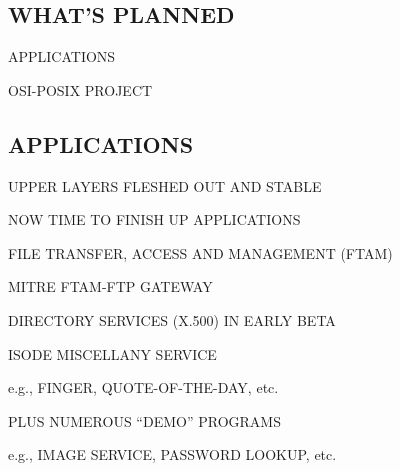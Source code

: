 

\begin{bwslide}
\part	{WHAT'S PLANNED}\bf

\begin{nrtc}
\item	APPLICATIONS

\item	OSI-POSIX PROJECT
\end{nrtc}
\end{bwslide}


\begin{bwslide}
\part*	{APPLICATIONS}\bf

\begin{nrtc}
\item	UPPER LAYERS FLESHED OUT AND STABLE

\item	NOW TIME TO FINISH UP APPLICATIONS
\end{nrtc}
\end{bwslide}


\begin{bwslide}

\begin{nrtc}
\item	FILE TRANSFER, ACCESS AND MANAGEMENT (FTAM)

\item	MITRE FTAM-FTP GATEWAY

\item	DIRECTORY SERVICES (X.500) IN EARLY BETA

\item	ISODE MISCELLANY SERVICE
    \begin{nrtc}
    \item	e.g., FINGER, QUOTE-OF-THE-DAY, etc.
    \end{nrtc}

\item	PLUS NUMEROUS ``DEMO'' PROGRAMS
    \begin{nrtc}
    \item	e.g., IMAGE SERVICE, PASSWORD LOOKUP, etc.
    \end{nrtc}
\end{nrtc}
\end{bwslide}


